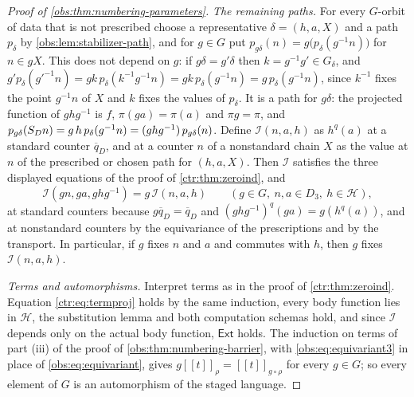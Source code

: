 \begin{proof}[Proof of \cref{obs:thm:numbering-parameters}]
\emph{The remaining paths.} For every $G$-orbit of data that is not prescribed
choose a representative $\delta=(h,a,X)$ and a path $p_\delta$ by
\cref{obs:lem:stabilizer-path}, and for $g\in G$ put
$p_{g\delta}(n)=g\bigl(p_\delta(g^{-1}n)\bigr)$ for $n\in gX$. This does not
depend on $g$: if $g\delta=g'\delta$ then $k=g^{-1}g'\in G_\delta$, and
$g'p_\delta(g'^{-1}n)=gk\,p_\delta(k^{-1}g^{-1}n)=gk\,p_\delta(g^{-1}n)
=g\,p_\delta(g^{-1}n)$, since $k^{-1}$ fixes the point $g^{-1}n$ of $X$ and $k$
fixes the values of $p_\delta$. It is a path for $g\delta$: the projected
function of $ghg^{-1}$ is $f$, $\pi(ga)=\pi(a)$ and $\pi g=\pi$, and
$p_{g\delta}(S_Dn)=g\,h\,p_\delta(g^{-1}n)=(ghg^{-1})\,p_{g\delta}(n)$.
Define $\mathcal{I}(n,a,h)$ as $h^{q}(a)$ at a standard counter
$\overline{q}_D$, and at a counter $n$ of a nonstandard chain $X$ as the value
at $n$ of the prescribed or chosen path for $(h,a,X)$. Then $\mathcal{I}$
satisfies the three displayed equations of the proof of \cref{ctr:thm:zeroind},
and
\begin{equation}
\label{obs:eq:equivariant3}
\mathcal{I}(gn,ga,ghg^{-1})=g\,\mathcal{I}(n,a,h)\qquad
(g\in G,\ n,a\in D_3,\ h\in\mathscr{H}),
\end{equation}
at standard counters because $g\overline{q}_D=\overline{q}_D$ and
$(ghg^{-1})^{q}(ga)=g(h^{q}(a))$, and at nonstandard counters by the
equivariance of the prescriptions and by the transport. In particular, if
$g$ fixes $n$ and $a$ and commutes with $h$, then $g$ fixes
$\mathcal{I}(n,a,h)$.

\emph{Terms and automorphisms.} Interpret terms as in the proof of
\cref{ctr:thm:zeroind}. Equation \eqref{ctr:eq:termproj} holds by the same induction,
every body function lies in $\mathscr{H}$, the substitution lemma and both
computation schemas hold, and since $\mathcal{I}$ depends only on the actual
body function, $\mathsf{Ext}$ holds. The induction on terms of part (iii) of the
proof of \cref{obs:thm:numbering-barrier}, with \eqref{obs:eq:equivariant3} in
place of \eqref{obs:eq:equivariant}, gives
$g[\![t]\!]_\rho=[\![t]\!]_{g\circ\rho}$ for every $g\in G$; so every element
of $G$ is an automorphism of the staged language.


\end{proof}
